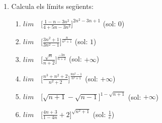 \documentclass{article}
\begin{document}
\begin{enumerate}
\item Calcula els límits següents:

\begin{enumerate}
	\item $lim \quad \Big[\frac{1-n-3n^2}{4+5n-3n^2}\Big]^{2n^2-3n+1}$ (sol: $0$)
	\item $lim \quad \Big[\frac{3n^2+1}{3n^2-1}\Big]^{\frac{n}{n^2+1}}$	(sol: $1$)
	\item $lim \quad \Big[\frac{\sqrt{n}}{n+2}\Big]^{\frac{-3n}{n+2}}$ (sol: $+\infty$)
	\item $lim \quad \Big[\frac{n^3+n^2+2}{n^2+2}\Big]^{\frac{8n^2-1}{n^2+1}}$  (sol: $+\infty$)
	\item $lim \quad \Big[\sqrt{n+1}-\sqrt{n-1}\Big]^{1-\sqrt{n+1}}$ (sol: $+\infty $)
	\item $lim \quad \Big[\frac{4n+3}{1-4n}+2\Big]^{\sqrt{n^2+1}}$ (sol: $\frac{1}{e}$)			
\end{enumerate}

\end{enumerate}
 
\end{document}
